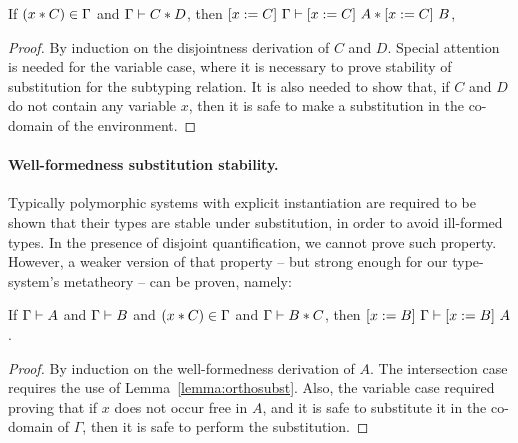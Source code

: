 \begin{lemma}
  \label{lemma:orthosubst}

  If $(x \disjoint C) \in \Gamma$ and $\jdis \Gamma C D$, 
  then $\jdis {\subst C x \Gamma} {\subst C x A} {\subst C x B}$,
\end{lemma}

\begin{proof}
  By induction on the disjointness derivation of $C$ and $D$.
  Special attention is needed for the variable case, where it is necessary to prove stability
  of substitution for the subtyping relation.
  It is also needed to show that, if $C$ and $D$ do not contain any variable $x$, then it is
  safe to make a substitution in the co-domain of the environment.
\end{proof}

\paragraph{Well-formedness substitution stability.}
Typically polymorphic systems with explicit instantiation are required to be shown that their
types are stable under substitution, in order to avoid ill-formed types.
In the presence of disjoint quantification, we cannot prove such property.
However, a weaker version of that property -- but strong enough for our type-system's metatheory 
-- can be proven, namely:

\begin{lemma}
  \label{lemma:wfsubst}

  If $\jwf \Gamma A$ and $\jwf \Gamma B$ and $(x \disjoint C) \in \Gamma$ 
  and $\jdis \Gamma B C$, then $\jwf {\subst B x \Gamma} {\subst B x A}$.
\end{lemma}

%

\begin{proof}
By induction on the well-formedness derivation of $A$.
The intersection case requires the use of Lemma~\ref{lemma:orthosubst}.
Also, the variable case required proving that if $x$ does not occur free in $A$, and it is safe
to substitute it in the co-domain of $\Gamma$, then it is safe to perform the substitution.
\end{proof}

